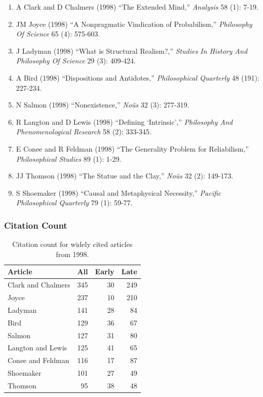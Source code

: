 \documentclass[
  10pt,
  letterpaper,
  DIV=11,
  numbers=noendperiod,
  twoside]{scrartcl}
\providecommand{\tightlist}{%
  \setlength{\itemsep}{0pt}\setlength{\parskip}{0pt}}\usepackage{longtable,booktabs,array}
\begin{document}
\begin{enumerate}
\def\labelenumi{\arabic{enumi}.}
\tightlist
\item
  A Clark and D Chalmers (1998) ``The Extended Mind,'' \emph{Analysis}
  58 (1): 7-19.
\item
  JM Joyce (1998) ``A Nonpragmatic Vindication of Probabilism,''
  \emph{Philosophy Of Science} 65 (4): 575-603.
\item
  J Ladyman (1998) ``What is Structural Realism?,'' \emph{Studies In
  History And Philosophy Of Science} 29 (3): 409-424.
\item
  A Bird (1998) ``Dispositions and Antidotes,'' \emph{Philosophical
  Quarterly} 48 (191): 227-234.
\item
  N Salmon (1998) ``Nonexistence,'' \emph{Noûs} 32 (3): 277-319.
\item
  R Langton and D Lewis (1998) ``Defining `Intrinsic',''
  \emph{Philosophy And Phenomenological Research} 58 (2): 333-345.
\item
  E Conee and R Feldman (1998) ``The Generality Problem for
  Reliabilism,'' \emph{Philosophical Studies} 89 (1): 1-29.
\item
  JJ Thomson (1998) ``The Statue and the Clay,'' \emph{Noûs} 32 (2):
  149-173.
\item
  S Shoemaker (1998) ``Causal and Metaphysical Necessity,''
  \emph{Pacific Philosophical Quarterly} 79 (1): 59-77.
\end{enumerate}

\subsubsection*{Citation Count}\label{sec-count-1998}

\begin{longtable}[]{@{}lrrr@{}}

\caption{\label{tbl-citation-count-1998}Citation count for widely cited
articles from 1998.}

\tabularnewline

\toprule\noalign{}
Article & All & Early & Late \\
\midrule\noalign{}
\endhead
\bottomrule\noalign{}
\endlastfoot
Clark and Chalmers & 345 & 30 & 249 \\
Joyce & 237 & 10 & 210 \\
Ladyman & 141 & 28 & 84 \\
Bird & 129 & 36 & 67 \\
Salmon & 127 & 31 & 80 \\
Langton and Lewis & 125 & 41 & 65 \\
Conee and Feldman & 116 & 17 & 87 \\
Shoemaker & 101 & 27 & 49 \\
Thomson & 95 & 38 & 48 \\

\end{longtable}
\end{document}
